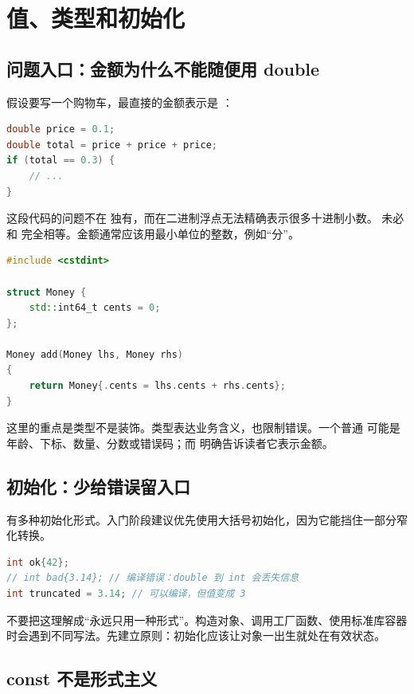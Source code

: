 \chapter{值、类型和初始化}

\section{问题入口：金额为什么不能随便用 double}

假设要写一个购物车，最直接的金额表示是 ：

\begin{lstlisting}[language=C++,caption={金额直接用 double 的朴素写法}]
double price = 0.1;
double total = price + price + price;
if (total == 0.3) {
    // ...
}
\end{lstlisting}

这段代码的问题不在 \cpp 独有，而在二进制浮点无法精确表示很多十进制小数。 未必和  完全相等。金额通常应该用最小单位的整数，例如“分”。

\begin{lstlisting}[language=C++,caption={用整数分表示金额}]
#include <cstdint>

struct Money {
    std::int64_t cents = 0;
};

Money add(Money lhs, Money rhs)
{
    return Money{.cents = lhs.cents + rhs.cents};
}
\end{lstlisting}

这里的重点是类型不是装饰。类型表达业务含义，也限制错误。一个普通  可能是年龄、下标、数量、分数或错误码；而  明确告诉读者它表示金额。

\section{初始化：少给错误留入口}

\cpp 有多种初始化形式。入门阶段建议优先使用大括号初始化，因为它能挡住一部分窄化转换。

\begin{lstlisting}[language=C++,caption={大括号初始化拒绝窄化转换}]
int ok{42};
// int bad{3.14}; // 编译错误：double 到 int 会丢失信息
int truncated = 3.14; // 可以编译，但值变成 3
\end{lstlisting}

不要把这理解成“永远只用一种形式”。构造对象、调用工厂函数、使用标准库容器时会遇到不同写法。先建立原则：初始化应该让对象一出生就处在有效状态。

\section{const 不是形式主义}


